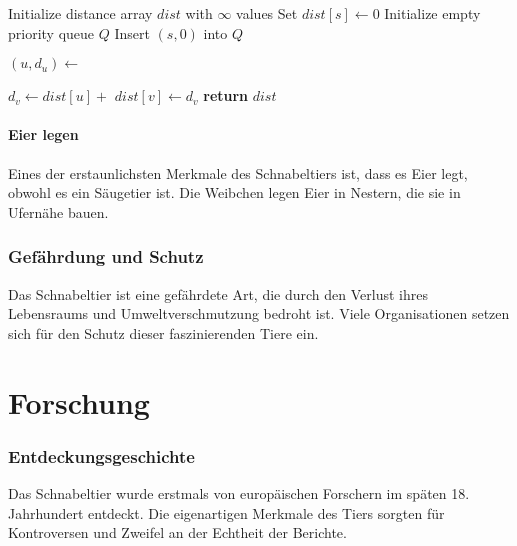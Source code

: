 \documentclass{article}
\begin{document}
            \begin{algorithm}
                   
                        \State Initialize distance array $dist$ with $\infty$ values
                        \State Set $dist[s] \gets 0$ 
                        \State Initialize empty priority queue $Q$
                        \State Insert $(s, 0)$ into $Q$ 

                          \State $(u, d_u) \gets$  

                            \State $d_v \gets dist[u] +$  
                              \State $dist[v] \gets d_v$ 
                              \State {} 
                            \EndIf
                          \EndFor
                        \EndWhile
                        \State \textbf{return} $dist$
                  \EndProcedure
            \end{algorithm}

        \subsection{Eier legen}
        Eines der erstaunlichsten Merkmale des Schnabeltiers ist, dass es Eier legt, obwohl es ein Säugetier ist. Die Weibchen legen Eier in Nestern, die sie in Ufernähe bauen.

    \section{Gefährdung und Schutz}
    Das Schnabeltier ist eine gefährdete Art, die durch den Verlust ihres Lebensraums und Umweltverschmutzung bedroht ist. Viele Organisationen setzen sich für den Schutz dieser faszinierenden Tiere ein.

\part{Forschung}
    \section{Entdeckungsgeschichte}
    Das Schnabeltier wurde erstmals von europäischen Forschern im späten 18. Jahrhundert entdeckt. Die eigenartigen Merkmale des Tiers sorgten für Kontroversen und Zweifel an der Echtheit der Berichte.
\end{document}
